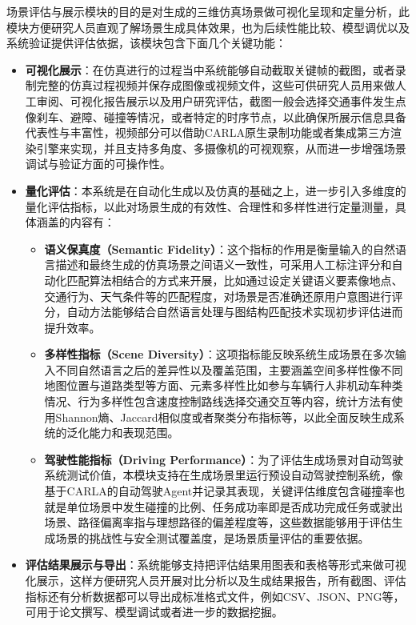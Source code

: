场景评估与展示模块的目的是对生成的三维仿真场景做可视化呈现和定量分析，此模块方便研究人员直观了解场景生成具体效果，也为后续性能比较、模型调优以及系统验证提供评估依据，该模块包含下面几个关键功能：

\begin{itemize}
	\item \textbf{可视化展示}：在仿真进行的过程当中系统能够自动截取关键帧的截图，或者录制完整的仿真过程视频并保存成图像或视频文件，这些可供研究人员用来做人工审阅、可视化报告展示以及用户研究评估，截图一般会选择交通事件发生点像刹车、避障、碰撞等情况，或者特定的时序节点，以此确保所展示信息具备代表性与丰富性，视频部分可以借助CARLA原生录制功能或者集成第三方渲染引擎来实现，并且支持多角度、多摄像机的可视观察，从而进一步增强场景调试与验证方面的可操作性。
	
	\item \textbf{量化评估}：本系统是在自动化生成以及仿真的基础之上，进一步引入多维度的量化评估指标，以此对场景生成的有效性、合理性和多样性进行定量测量，具体涵盖的内容有：
	
	\begin{itemize}
		\item \textbf{语义保真度（Semantic Fidelity）}：这个指标的作用是衡量输入的自然语言描述和最终生成的仿真场景之间语义一致性，可采用人工标注评分和自动化匹配算法相结合的方式来开展，比如通过设定关键语义要素像地点、交通行为、天气条件等的匹配程度，对场景是否准确还原用户意图进行评分，自动方法能够结合自然语言处理与图结构匹配技术实现初步评估进而提升效率。
		

		\item \textbf{多样性指标（Scene Diversity）}：这项指标能反映系统生成场景在多次输入不同自然语言之后的差异性以及覆盖范围，主要涵盖空间多样性像不同地图位置与道路类型等方面、元素多样性比如参与车辆行人非机动车种类情况、行为多样性包含速度控制路线选择交通交互等内容，统计方法有使用Shannon熵、Jaccard相似度或者聚类分布指标等，以此全面反映生成系统的泛化能力和表现范围。
		
		\item \textbf{驾驶性能指标（Driving Performance）}：为了评估生成场景对自动驾驶系统测试价值，本模块支持在生成场景里运行预设自动驾驶控制系统，像基于CARLA的自动驾驶Agent并记录其表现，关键评估维度包含碰撞率也就是单位场景中发生碰撞的比例、任务成功率即是否成功完成任务或驶出场景、路径偏离率指与理想路径的偏差程度等，这些数据能够用于评估生成场景的挑战性与安全测试覆盖度，是场景质量评估的重要依据。
	\end{itemize}
	
	\item \textbf{评估结果展示与导出}：系统能够支持把评估结果用图表和表格等形式来做可视化展示，这样方便研究人员开展对比分析以及生成结果报告，所有截图、评估指标还有分析数据都可以导出成标准格式文件，例如CSV、JSON、PNG等，可用于论文撰写、模型调试或者进一步的数据挖掘。
	
\end{itemize}